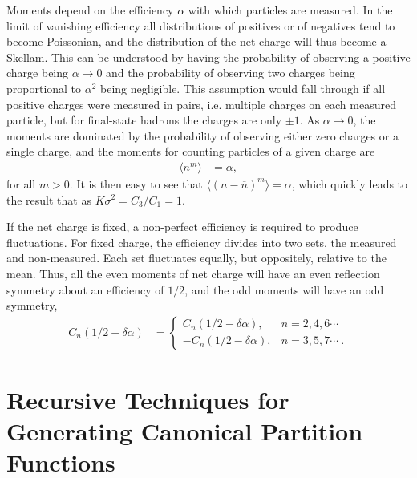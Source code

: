 \documentclass[aps,prc,nofootinbib,showpacs,superscriptaddress,groupedaddress]{revtex4-1}
\begin{document}
Moments depend on the efficiency $\alpha$ with which particles are measured. In the limit of vanishing efficiency all distributions of positives or of negatives tend to become Poissonian, and the distribution of the net charge will thus become a Skellam.  This can be understood by having the probability of observing a positive charge being $\alpha\rightarrow 0$ and the probability of observing two charges being proportional to $\alpha^2$ being negligible. This assumption would fall through if all positive charges were measured in pairs, i.e. multiple charges on each measured particle, but for final-state hadrons the charges are only $\pm 1$. As $\alpha\rightarrow 0$, the moments are dominated by the probability of observing either zero charges or a single charge, and the moments for counting particles of a given charge are
\begin{eqnarray}
\langle n^m\rangle&=\alpha,
\end{eqnarray}
for all $m>0$. It is then easy to see that $\langle (n-\overline{n})^m\rangle=\alpha$, which quickly leads to the result that as $K\sigma^2=C_3/C_1=1$.

If the net charge is fixed, a non-perfect efficiency is required to produce fluctuations. For fixed charge, the efficiency divides into two sets, the measured and non-measured. Each set fluctuates equally, but oppositely, relative to the mean. Thus, all the even moments of net charge will have an even reflection symmetry about an efficiency of $1/2$, and the odd moments will have an odd symmetry,
\begin{eqnarray}
\label{eq:alphasymm}
C_n(1/2+\delta\alpha)&=\left\{\begin{array}{rl}
C_n(1/2-\delta\alpha),&n=2,4,6\cdots\\
-C_n(1/2-\delta\alpha),&n=3,5,7\cdots~.\end{array}\right.
\end{eqnarray}

\section{Recursive Techniques for Generating Canonical Partition Functions}\label{sec:theoryexact}
\end{document}
